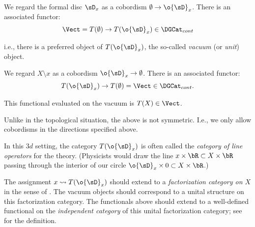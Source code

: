 We regard the formal disc $\sD_x$ as a cobordism
$\emptyset \to \o{\sD}_x$. There is an associated functor:
%
\[
\Vect = T(\emptyset) \to T(\o{\sD}_x) \in \DGCat_{cont}
\]

 i.e., there is a preferred object of $T(\o{\sD}_x)$,
the so-called \emph{vacuum} (or \emph{unit}) object.

We regard $X \setminus x$ as a cobordism
$\o{\sD}_x \to \emptyset$. There is an associated functor:
%
\[
T(\o{\sD}_x) \to T(\emptyset) = \Vect \in \DGCat_{cont}.
\]

 This functional evaluated on the vacuum is
$T(X) \in \Vect$.

\begin{rem}
\notready

Unlike in the topological situation, the above is not symmetric.
I.e., we only allow cobordisms in the directions specified above.

\end{rem}

\begin{rem}
\notready

In this $3d$ setting, the category $T(\o{\sD}_x)$ is often
called the \emph{category of line operators} for the theory. (Physicists would
draw the line $x \times \bR \subset X \times \bR$ passing through
the interior of our circle $\o{\sD}_x \times 0 \subset X \times \bR$.)

\end{rem}

\begin{rem}
\notready\label{r:fact-cats}

The assignment $x \rightsquigarrow T(\o{\sD}_x)$ should extend
to a \emph{factorization category on $X$} in the sense of
\cite{chiralcats}. The vacuum objects should correspond to a unital
structure on this factorization category. The functionals
above should extend to a well-defined functional on the
\emph{independent category} of this unital factorization category;
see \cite{indep-cat} for the definition.

\end{rem}

